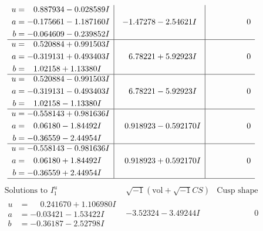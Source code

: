\documentclass[1p]{elsarticle_modified}
\theoremstyle{definition}
\newcommand{\I}{\sqrt{-1}}
\begin{document}
$$\begin{array}{c|c|c}
\begin{aligned}
u &= \phantom{-}0.887934 - 0.028589 I \\
a &= -0.175661 - 1.187160 I \\
b &= -0.064609 - 0.239852 I\end{aligned}
 & -1.47278 - 2.54621 I & \phantom{-0.000000 } 0 \\ \hline\begin{aligned}
u &= \phantom{-}0.520884 + 0.991503 I \\
a &= -0.319131 + 0.493403 I \\
b &= \phantom{-}1.02158 + 1.13380 I\end{aligned}
 & \phantom{-}6.78221 + 5.92923 I & \phantom{-0.000000 } 0 \\ \hline\begin{aligned}
u &= \phantom{-}0.520884 - 0.991503 I \\
a &= -0.319131 - 0.493403 I \\
b &= \phantom{-}1.02158 - 1.13380 I\end{aligned}
 & \phantom{-}6.78221 - 5.92923 I & \phantom{-0.000000 } 0 \\ \hline\begin{aligned}
u &= -0.558143 + 0.981636 I \\
a &= \phantom{-}0.06180 - 1.84492 I \\
b &= -0.36559 - 2.44954 I\end{aligned}
 & \phantom{-}0.918923 - 0.592170 I & \phantom{-0.000000 } 0 \\ \hline\begin{aligned}
u &= -0.558143 - 0.981636 I \\
a &= \phantom{-}0.06180 + 1.84492 I \\
b &= -0.36559 + 2.44954 I\end{aligned}
 & \phantom{-}0.918923 + 0.592170 I & \phantom{-0.000000 } 0\\
 \hline 
 \end{array}$$\newpage$$\begin{array}{c|c|c}  
\text{Solutions to }I^u_{1}& \I (\text{vol} + \sqrt{-1}CS) & \text{Cusp shape}\\
 \hline 
\begin{aligned}
u &= \phantom{-}0.241670 + 1.106980 I \\
a &= -0.03421 - 1.53422 I \\
b &= -0.36187 - 2.52798 I\end{aligned}
 & -3.52324 - 3.49244 I & \phantom{-0.000000 } 0 \\ \hline\begin{aligned}

\end{aligned}
\end{array}$$
\end{document}
